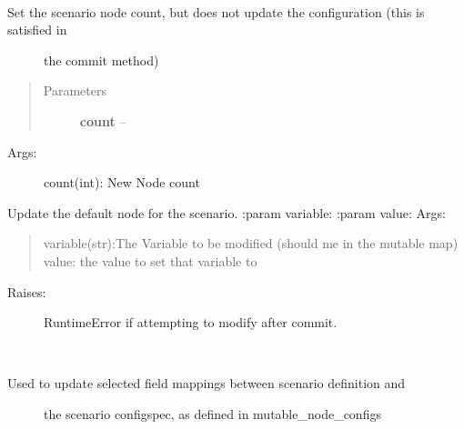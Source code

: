 \documentclass[letterpaper,10pt,english]{sphinxmanual}
\begin{document}
\begin{fulllineitems}

\begin{fulllineitems}
\label{index:polybos.Scenario.set_node_count}~\begin{description}
\item[{Set the scenario node count, but does not update the configuration (this is satisfied in}] \leavevmode
the commit method)

\end{description}
\begin{quote}\begin{description}
\item[{Parameters}] \leavevmode
\textbf{count} -- 

\end{description}\end{quote}
\begin{description}
\item[{Args:}] \leavevmode
count(int): New Node count

\end{description}

\end{fulllineitems}


\begin{fulllineitems}
\label{index:polybos.Scenario.update_default_node}
Update the default node for the scenario.
:param variable:
:param value:
Args:
\begin{quote}

variable(str):The Variable to be modified (should me in the mutable map)
value: the value to set that variable to
\end{quote}
\begin{description}
\item[{Raises:}] \leavevmode
RuntimeError if attempting to modify after commit.

\end{description}

\end{fulllineitems}


\begin{fulllineitems}
\label{index:polybos.Scenario.update_node}~\begin{description}
\item[{Used to update selected field mappings between scenario definition and}] \leavevmode
the scenario configspec, as defined in mutable\_node\_configs


\end{description}
\end{fulllineitems}
\end{fulllineitems}
\end{document}
